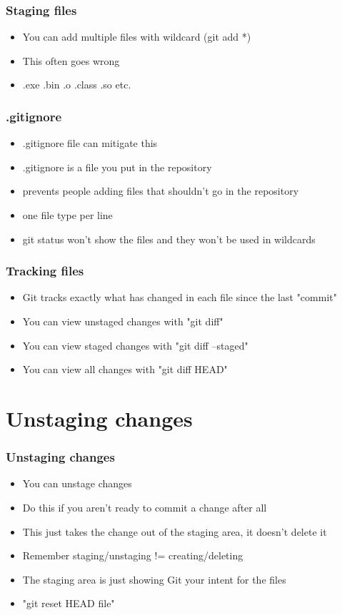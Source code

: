 \documentclass{beamer}
\begin{document}
\begin{frame}
\frametitle{Staging files}
\begin{itemize}
\item You can add multiple files with wildcard (git add *)
\item This often goes wrong
\item .exe .bin .o .class .so etc.
\end{itemize}
\end{frame}

\begin{frame}
\frametitle{.gitignore}
\begin{itemize}
\item .gitignore file can mitigate this
\item .gitignore is a file you put in the repository
\item prevents people adding files that shouldn't go in the repository
\item one file type per line
\item git status won't show the files and they won't be used in wildcards
\end{itemize}
\end{frame}

\begin{frame}
\frametitle{Tracking files}
\begin{itemize}
\item Git tracks exactly what has changed in each file since the last "commit"
\item You can view unstaged changes with "git diff"
\item You can view staged changes with "git diff --staged"
\item You can view all changes with "git diff HEAD"
\end{itemize}
\end{frame}

\section{Unstaging changes}
\begin{frame}
\frametitle{Unstaging changes}
\begin{itemize}
\item You can unstage changes
\item Do this if you aren't ready to commit a change after all
\item This just takes the change out of the staging area, it doesn't delete it
\item Remember staging/unstaging != creating/deleting
\item The staging area is just showing Git your intent for the files
\item "git reset HEAD file"
\end{itemize}
\end{frame}
\end{document}
